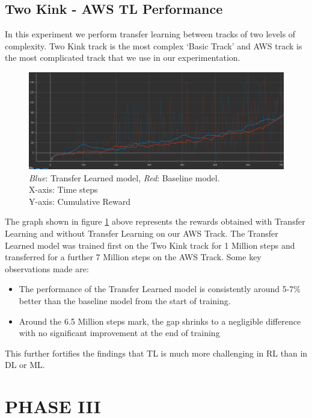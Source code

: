 \subsection{Two Kink - AWS TL Performance}
In this experiment we perform transfer learning between tracks of two levels of complexity. Two Kink track is the most complex `Basic Track' and AWS track is the most complicated track that we use in our experimentation.
\begin{figure}[H]
    \centering
    \includegraphics[width=1.0\textwidth]{images/graphs/TL-TwoKink-AWS.png}
    \caption{\centering \textit{Blue}: Transfer Learned model, \textit{Red}: Baseline model. \\ X-axis: Time steps \\ Y-axis: Cumulative Reward }
   
    
    \label{TL-TwoKink-AWS}
\end{figure}
The graph shown in figure \ref{TL-TwoKink-AWS} above represents the rewards obtained with Transfer Learning and without Transfer Learning on our AWS Track. The Transfer Learned model was trained first on the Two Kink track for 1 Million steps and transferred for a further 7 Million steps on the AWS Track. Some key observations made are:
\begin{itemize}
\item The performance of the Transfer Learned model is consistently around 5-7\% better than the baseline model from the start of training.
\item Around the 6.5 Million steps mark, the gap shrinks to a negligible difference with no significant improvement at the end of training
\end{itemize}

This further fortifies the findings that TL is much more challenging in RL than in DL or ML.


\section{PHASE III}



